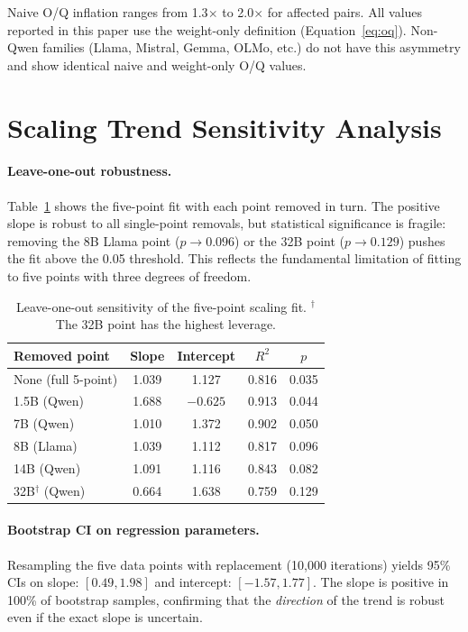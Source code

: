 \documentclass[11pt]{article}
\begin{document}
Naive O/Q inflation ranges from 1.3$\times$ to 2.0$\times$ for affected
pairs.
All values reported in this paper use the weight-only definition
(Equation~\ref{eq:oq}).
Non-Qwen families (Llama, Mistral, Gemma, OLMo, etc.) do not have this
asymmetry and show identical naive and weight-only O/Q values.

\section{Scaling Trend Sensitivity Analysis}
\label{app:sensitivity}

\paragraph{Leave-one-out robustness.}
Table~\ref{tab:loo} shows the five-point fit with each point removed in turn.
The positive slope is robust to all single-point removals, but statistical
significance is fragile: removing the 8B Llama point ($p \to 0.096$) or the
32B point ($p \to 0.129$) pushes the fit above the 0.05 threshold.
This reflects the fundamental limitation of fitting to five points with three
degrees of freedom.

\begin{table}[h]
\centering
\caption{Leave-one-out sensitivity of the five-point scaling fit.
$^\dagger$The 32B point has the highest leverage.}
\label{tab:loo}
\begin{tabular}{lcccc}
\toprule
Removed point & Slope & Intercept & $R^2$ & $p$ \\
\midrule
None (full 5-point) & 1.039 & 1.127 & 0.816 & 0.035 \\
1.5B (Qwen) & 1.688 & $-0.625$ & 0.913 & 0.044 \\
7B (Qwen) & 1.010 & 1.372 & 0.902 & 0.050 \\
8B (Llama) & 1.039 & 1.112 & 0.817 & 0.096 \\
14B (Qwen) & 1.091 & 1.116 & 0.843 & 0.082 \\
32B$^\dagger$ (Qwen) & 0.664 & 1.638 & 0.759 & 0.129 \\
\bottomrule
\end{tabular}
\end{table}

\paragraph{Bootstrap CI on regression parameters.}
Resampling the five data points with replacement (10,000 iterations) yields
95\% CIs on slope: $[0.49, 1.98]$ and intercept: $[-1.57, 1.77]$.
The slope is positive in 100\% of bootstrap samples, confirming that the
\emph{direction} of the trend is robust even if the exact slope is uncertain.
\end{document}
